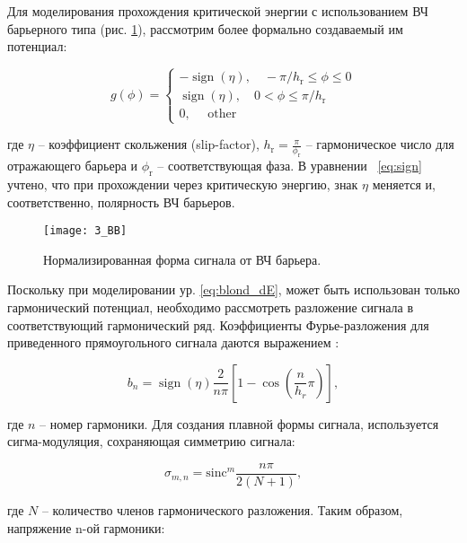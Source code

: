 \par Для моделирования прохождения критической энергии с использованием ВЧ барьерного типа (рис. \ref{fig:rf}), рассмотрим более формально создаваемый им потенциал:

\begin{equation}
g(\phi)=\left\{\begin{array}{c}
-\operatorname{sign}(\eta),\quad -\pi / h_{\textrm{r}} \leq \phi \leq 0 \\
\operatorname{sign}(\eta),\quad 0<\phi \leq \pi / h_{\textrm{r}} \\
0, \quad \text { other }
\end{array}\right.
\label{eq:sign}
\end{equation}

\noindent где $\eta$ – коэффициент скольжения (slip-factor), $h_{\textrm{r}}=\frac{\pi}{\phi_{\textrm{r}}}$ – гармоническое число для отражающего барьера и $\phi_{\textrm{r}}$ – соответствующая фаза.  В у\-рав\-не\-нии~ \ref{eq:sign} учтено, что при прохождении через критическую энергию, знак $\eta$ меняется и, соответственно, полярность ВЧ барьеров.

\begin{figure}[!h]
  \centering
   \texttt{[image: 3\_BB]}
   \caption{Нормализированная форма сигнала от ВЧ барьера.}
   \label{fig:rf}
\end{figure}

\par Поскольку при моделировании ур. \ref{eq:blond_dE}, может быть использован только гармонический потенциал, необходимо рассмотреть разложение сигнала в соответствующий гармонический ряд. Коэффициенты Фурье-разложения для приведенного прямоугольного сигнала даются выражением \cite{cern:bb}:

\begin{equation}
b_n=\operatorname{sign}{\left(\eta\right)}\frac{2}{n\pi}\left[1-\cos{\left(\frac{n}{h_r}\pi\right)}\right],
\label{b}
\end{equation}

\noindent где $n$ – номер гармоники. Для создания плавной формы сигнала, используется сигма-модуляция, сохраняющая симметрию сигнала:

\begin{equation}
\sigma_{m, n}={\text{sinc}}^m{\frac{n\pi}{2\left(N+1\right)}},
\label{sigma}
\end{equation}

\noindent где $N$ – количество членов гармонического разложения. Таким образом, напряжение n-ой гармоники:

